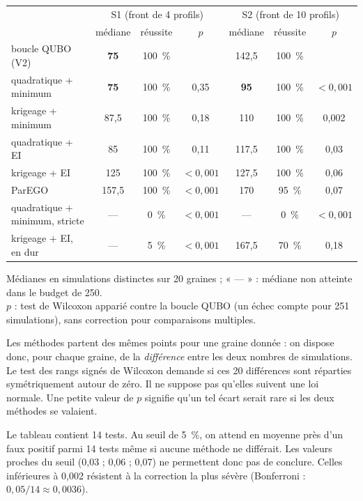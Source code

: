 \begin{center}
\renewcommand{\arraystretch}{1.15}
\begin{tabular}{lcccccc}
\toprule
 & \multicolumn{3}{c}{S1 (front de 4 profils)} & \multicolumn{3}{c}{S2 (front de 10 profils)} \\
 & médiane & réussite & $p$ & médiane & réussite & $p$ \\
\midrule
boucle QUBO (V2) & \textbf{75} & 100~\% & & 142,5 & 100~\% & \\
quadratique + minimum & \textbf{75} & 100~\% & 0,35 & \textbf{95} & 100~\% & $<0{,}001$ \\
krigeage + minimum & 87,5 & 100~\% & 0,18 & 110 & 100~\% & 0,002 \\
quadratique + EI & 85 & 100~\% & 0,11 & 117,5 & 100~\% & 0,03 \\
krigeage + EI & 125 & 100~\% & $<0{,}001$ & 127,5 & 100~\% & 0,06 \\
ParEGO & 157,5 & 100~\% & $<0{,}001$ & 170 & 95~\% & 0,07 \\
\midrule
quadratique + minimum, stricte & --- & 0~\% & $<0{,}001$ & --- & 0~\% & $<0{,}001$ \\
krigeage + EI, en dur & --- & 5~\% & $<0{,}001$ & 167,5 & 70~\% & 0,18 \\
\bottomrule
\end{tabular}

\smallskip
{\footnotesize Médianes en simulations distinctes sur 20 graines ; « --- » : médiane non atteinte dans le budget de 250.\\ $p$ : test de Wilcoxon apparié contre la boucle QUBO (un échec compte pour 251 simulations), sans correction pour comparaisons multiples.}
\end{center}

\begin{definition}
Les méthodes partent des mêmes points pour une graine donnée : on dispose donc, pour chaque graine, de la \emph{différence} entre les deux nombres de simulations. Le test des rangs signés de Wilcoxon demande si ces 20 différences sont réparties symétriquement autour de zéro. Il ne suppose pas qu'elles suivent une loi normale. Une petite valeur de $p$ signifie qu'un tel écart serait rare si les deux méthodes se valaient.
\end{definition}

\begin{piege}
Le tableau contient 14 tests. Au seuil de 5~\%, on attend en moyenne près d'un faux positif parmi 14 tests même si aucune méthode ne différait. Les valeurs proches du seuil (0,03 ; 0,06 ; 0,07) ne permettent donc pas de conclure. Celles inférieures à 0,002 résistent à la correction la plus sévère (Bonferroni : $0{,}05/14\approx0{,}0036$).
\end{piege}

